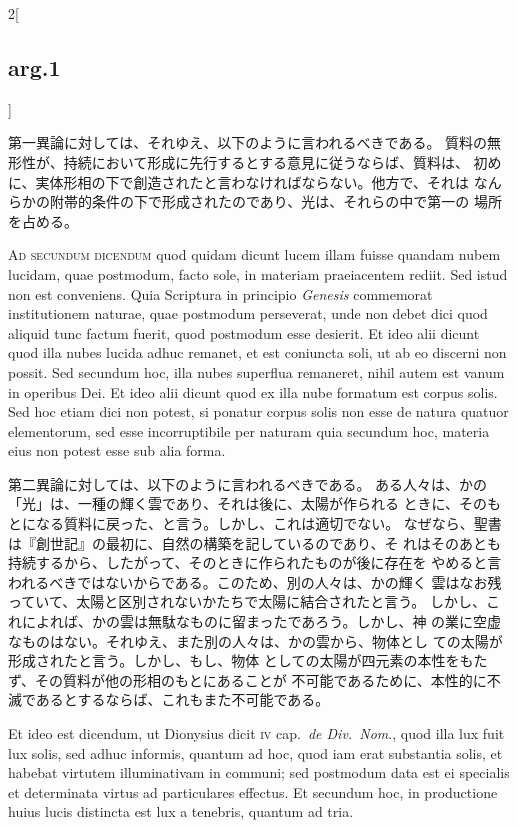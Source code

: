 \documentclass[paper=a4paper,fontsize=10pt,jafontsize=9pt,titlepage]{jlreq}
\begin{document}
\begin{paracol}{2}[\subsection{arg.1}]
\switchcolumn

第一異論に対しては、それゆえ、以下のように言われるべきである。
質料の無形性が、持続において形成に先行するとする意見に従うならば、質料は、
 初めに、実体形相の下で創造されたと言わなければならない。他方で、それは
 なんらかの附帯的条件の下で形成されたのであり、光は、それらの中で第一の
 場所を占める。

\switchcolumn*[\subsection{ad.2}]

{\scshape Ad secundum dicendum} quod quidam dicunt lucem
illam fuisse quandam nubem lucidam, quae postmodum, facto sole, in
materiam praeiacentem rediit. Sed istud non est conveniens. Quia
Scriptura in principio {\itshape Genesis} commemorat institutionem naturae, quae
postmodum perseverat, unde non debet dici quod aliquid tunc factum
fuerit, quod postmodum esse desierit. Et ideo alii dicunt quod illa
nubes lucida adhuc remanet, et est coniuncta soli, ut ab eo discerni non
possit. Sed secundum hoc, illa nubes superflua remaneret, nihil autem
est vanum in operibus Dei. Et ideo alii dicunt quod ex illa nube
formatum est corpus solis. Sed hoc etiam dici non potest, si ponatur
corpus solis non esse de natura quatuor elementorum, sed esse
incorruptibile per naturam quia secundum hoc, materia eius non potest
esse sub alia forma.

\switchcolumn

第二異論に対しては、以下のように言われるべきである。
ある人々は、かの「光」は、一種の輝く雲であり、それは後に、太陽が作られる
 ときに、そのもとになる質料に戻った、と言う。しかし、これは適切でない。
 なぜなら、聖書は『創世記』の最初に、自然の構築を記しているのであり、そ
 れはそのあとも持続するから、したがって、そのときに作られたものが後に存在を
 やめると言われるべきではないからである。このため、別の人々は、かの輝く
 雲はなお残っていて、太陽と区別されないかたちで太陽に結合されたと言う。
 しかし、これによれば、かの雲は無駄なものに留まったであろう。しかし、神
 の業に空虚なものはない。それゆえ、また別の人々は、かの雲から、物体とし
 ての太陽が形成されたと言う。しかし、もし、物体
 としての太陽が四元素の本性をもたず、その質料が他の形相のもとにあることが
 不可能であるために、本性的に不滅であるとするならば、これもまた不可能である。

\switchcolumn*

Et ideo est dicendum, ut Dionysius dicit {\scshape iv} cap.~{\itshape de
Div.~Nom}., quod illa lux fuit lux solis, sed adhuc informis, quantum ad
hoc, quod iam erat substantia solis, et habebat virtutem illuminativam
in communi; sed postmodum data est ei specialis et determinata virtus ad
particulares effectus. Et secundum hoc, in productione huius lucis
distincta est lux a tenebris, quantum ad tria.


\end{paracol}
\end{document}
